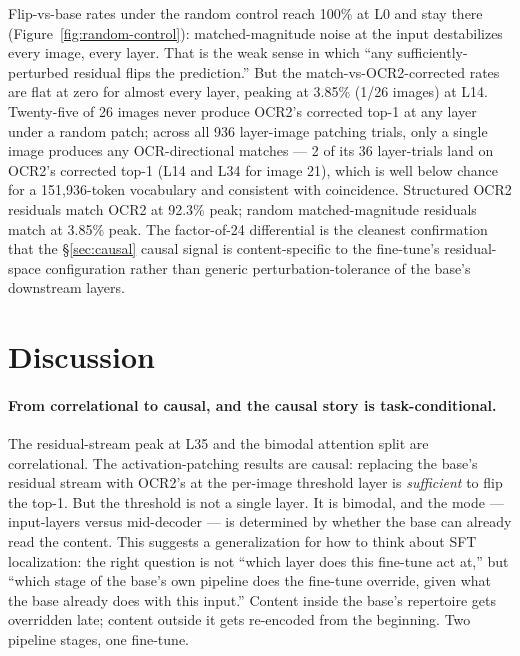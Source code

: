 \documentclass[10pt,twocolumn,letterpaper]{article}
\begin{document}
Flip-vs-base rates under the random control reach 100\% at L0 and stay there (Figure~\ref{fig:random-control}): matched-magnitude noise at the input destabilizes every image, every layer. That is the weak sense in which ``any sufficiently-perturbed residual flips the prediction.'' But the match-vs-OCR2-corrected rates are flat at zero for almost every layer, peaking at 3.85\% (1/26 images) at L14. Twenty-five of 26 images never produce OCR2's corrected top-1 at any layer under a random patch; across all 936 layer-image patching trials, only a single image produces any OCR-directional matches --- 2 of its 36 layer-trials land on OCR2's corrected top-1 (L14 and L34 for image 21), which is well below chance for a 151,936-token vocabulary and consistent with coincidence. Structured OCR2 residuals match OCR2 at 92.3\% peak; random matched-magnitude residuals match at 3.85\% peak. The factor-of-24 differential is the cleanest confirmation that the \S\ref{sec:causal} causal signal is content-specific to the fine-tune's residual-space configuration rather than generic perturbation-tolerance of the base's downstream layers.

\section{Discussion}
\label{sec:discussion}

\paragraph{From correlational to causal, and the causal story is task-conditional.} The residual-stream peak at L35 and the bimodal attention split are correlational. The activation-patching results are causal: replacing the base's residual stream with OCR2's at the per-image threshold layer is \emph{sufficient} to flip the top-1. But the threshold is not a single layer. It is bimodal, and the mode --- input-layers versus mid-decoder --- is determined by whether the base can already read the content. This suggests a generalization for how to think about SFT localization: the right question is not ``which layer does this fine-tune act at,'' but ``which stage of the base's own pipeline does the fine-tune override, given what the base already does with this input.'' Content inside the base's repertoire gets overridden late; content outside it gets re-encoded from the beginning. Two pipeline stages, one fine-tune.
\end{document}
